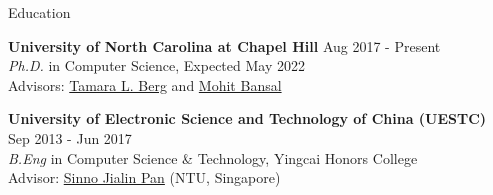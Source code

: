 \documentclass{resume} %
\begin{document}

\begin{rSection}{Education}

{\bf University of North Carolina at Chapel Hill} \hfill {Aug 2017  -  Present} \\ 
{\sl Ph.D.} in Computer Science, Expected May 2022 \\
Advisors: \href{http://www.tamaraberg.com/}{Tamara L. Berg} and \href{http://www.cs.unc.edu/~mbansal/}{Mohit Bansal}

{\bf University of Electronic Science and Technology of China (UESTC)} \hfill {Sep 2013 - Jun 2017} \\ 
{\sl B.Eng} in Computer Science \& Technology, Yingcai Honors College\\
Advisor: \href{https://personal.ntu.edu.sg/sinnopan/}{Sinno Jialin Pan} (NTU, Singapore)
\end{rSection}

\end{document}
